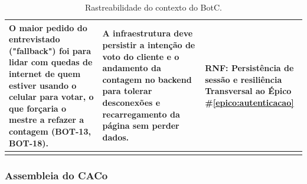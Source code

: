 \documentclass[12pt,a4paper]{article}
\newcounter{epico}
\begin{document}
\begin{longtable}{|p{7cm}|p{4.5cm}|p{4.5cm}|}
    \hline
    
    O maior pedido do entrevistado ("fallback") foi para lidar com quedas de internet de quem estiver usando o celular para votar, o que forçaria o mestre a refazer a contagem (BOT-13, BOT-18).
    & A infraestrutura deve persistir a intenção de voto do cliente e o andamento da contagem no backend para tolerar desconexões e recarregamento da página sem perder dados.
    & RNF: Persistência de sessão e resiliência
    \newline \newline Transversal ao Épico \#\ref{epico:autenticacao} \\
    \hline
    \caption{Rastreabilidade do contexto do BotC.}
\end{longtable}

\subsubsection{Assembleia do CACo}
\end{document}
